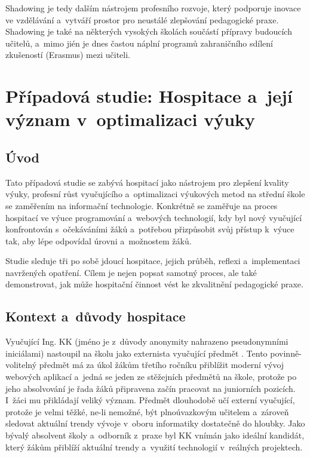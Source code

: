Shadowing je tedy dalším nástrojem profesního rozvoje, který podporuje inovace ve vzdělávání a~vytváří prostor pro neustálé zlepšování pedagogické praxe. Shadowing je také na některých vysokých školách součástí přípravy budoucích učitelů, a~mimo jién je dnes častou náplní programů zahraničního sdílení zkušeností (Erasmus) mezi učiteli.


\section{Případová studie: Hospitace a~její význam v~optimalizaci výuky}

\subsection*{Úvod}

Tato případová studie se zabývá hospitací jako nástrojem pro zlepšení kvality výuky, profesní růst vyučujícího a~optimalizaci výukových metod na střední škole se zaměřením na informační technologie. Konkrétně se zaměřuje na proces hospitací ve výuce programování a~webových technologií, kdy byl nový vyučující konfrontován s~očekáváními žáků a~potřebou přizpůsobit svůj přístup k~výuce tak, aby lépe odpovídal úrovni a~možnostem žáků.

Studie sleduje tři po sobě jdoucí hospitace, jejich průběh, reflexi a~implementaci navržených opatření. Cílem je nejen popsat samotný proces, ale také demonstrovat, jak může hospitační činnost vést ke zkvalitnění pedagogické praxe.

\subsection{Kontext a~důvody hospitace}

Vyučující Ing. KK (jméno je z~důvody anonymity nahrazeno pseudonymními iniciálami) nastoupil na školu jako externista vyučující předmět . Tento povinně-volitelný předmět má za úkol žákům třetího ročníku přiblížit moderní vývoj webových aplikací a~jedná se jeden ze stěžejních předmětů na škole, protože po jeho absolvování je řada žáků připravena začín pracovat na juniorních pozicích. I~žáci mu přikládají veliký význam. Předmět dlouhodobě učí externí vyučující, protože je velmi těžké, ne-li nemožné, být plnoúvazkovým učitelem a~zároveň sledovat aktuální trendy vývoje v~oboru informatiky dostatečně do hloubky. Jako bývalý absolvent školy a~odborník z~praxe byl KK vnímán jako ideální kandidát, který žákům přiblíží aktuální trendy a~využití technologií v~reálných projektech.

